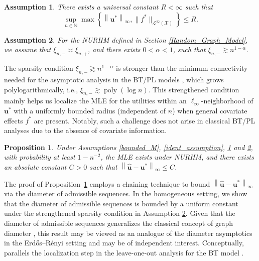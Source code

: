 \documentclass[
  12pt]{article}
\newtheorem{proposition}{Proposition}[section]
\newtheorem{assumption}{Assumption}
\begin{document}
\begin{assumption}
\label{uniform_bounded}
There exists a universal constant $R < \infty$ such that 
$$\sup _{n \in \mathbb{N}} \max \left\{\left\|\boldsymbol{u}^*\right\|_{\infty}, \|f^*\|_{\mathcal{L}^\infty(\mathcal{X})}\right\} \leq R.$$
\end{assumption}


\begin{assumption}\label{NURHM_sparsity}
For the NURHM defined in Section \ref{Random_Graph_Model}, we assume that $\xi_{n,-}\asymp \xi_{n,+}$, and there exists $0<\alpha<1$, such that $\xi_{n,-}\gtrsim  n^{1-\alpha}$.
\end{assumption}

The sparsity condition $\xi_{n,-} \gtrsim n^{1-\alpha}$  is stronger than the minimum connectivity needed for the asymptotic analysis in the BT/PL models \citep{chen2022partial, han2025unifiedanalysis}, which grows polylogarithmically, i.e., $\xi_{n,-} \gtrsim \operatorname{poly}(\log n)$. This strengthened condition mainly helps us localize the MLE for the utilities within an $\ell_\infty$-neighborhood of $\bm u^*$ with a uniformly bounded radius (independent of $n$) when general covariate effects $f^*$ are present.  Notably, such a challenge does not arise in classical BT/PL analyses due to the absence of covariate information.

\begin{proposition}
\label{lemma_uni_bounded}
Under Assumptions \ref{bounded_M}, \ref{ident_assumption}, \ref{uniform_bounded} and \ref{NURHM_sparsity}, with probability at least $1-n^{-2}$, the MLE exists under NURHM, and there exists an absolute constant $C>0$ such that $\left\|\widehat{\boldsymbol{u}}-\boldsymbol{u}^*\right\|_{\infty} \leq C$.
\end{proposition}
The proof of Proposition~\ref{lemma_uni_bounded} employs a chaining technique to bound $\left\|\widehat{\boldsymbol{u}}-\boldsymbol{u}^*\right\|_{\infty}$ via the diameter of admissible sequences. In the homogeneous setting, we show that the diameter of admissible sequences is bounded by a uniform constant under the strengthened sparsity condition in Assumption \ref{NURHM_sparsity}. Given that the diameter of admissible sequences generalizes the classical concept of graph diameter \citep{han2025unifiedanalysis}, this result may be viewed as an analogue of the diameter asymptotics in the Erdős--R\'enyi setting \cite[Chapter 7]{bollobas2011random} and may be of independent interest. Conceptually,  parallels the localization step in the leave-one-out analysis for the BT model \citep{chen2022partial}.
\end{document}

